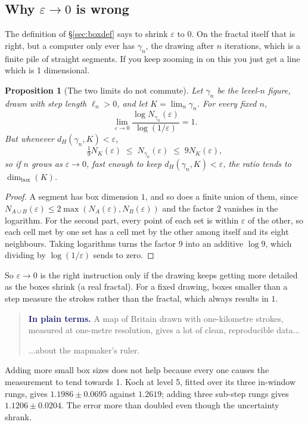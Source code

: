 \documentclass[11pt, a4paper]{article}
\theoremstyle{plain}
\newtheorem{proposition}[theorem]{Proposition}
\theoremstyle{definition}
\theoremstyle{remark}
\newenvironment{plainly}
  {\par\smallskip\begin{quote}\small\noindent
   \textcolor{MidnightBlue}{\textbf{In plain terms.}}\enspace\ignorespaces}
  {\end{quote}\smallskip}
\newcommand{\Bd}{\dim_{\mathrm{box}}}    %
\newcommand{\eps}{\varepsilon}
\begin{document}
\subsection{Why \texorpdfstring{$\eps \to 0$}{eps -> 0} is wrong}
\label{sec:rolloff}

The definition of \S\ref{sec:boxdef} says to shrink $\eps$ to $0$. On the
fractal itself that is right, but a computer only ever has $\gamma_n$, the
drawing after $n$ iterations, which is a finite pile of straight segments. If you keep zooming in on this you just get a line which is 1 dimensional.

\begin{proposition}[The two limits do not commute]
\label{prop:noncommuting}
    Let $\gamma_n$ be the level-$n$ figure, drawn with step length $\ell_n>0$,
    and let $K=\lim_n\gamma_n$. For every fixed $n$,
    \[
      \lim_{\eps\to0}\frac{\log N_{\gamma_n}(\eps)}{\log(1/\eps)} = 1.
    \]
    But whenever $d_H(\gamma_n,K)<\eps$,
    \[
      \tfrac19 N_K(\eps)\;\leq\;N_{\gamma_n}(\eps)\;\leq\;9N_K(\eps),
    \]
    so if $n$ grows as $\eps\to0$, fast enough to keep
    $d_H(\gamma_n,K)<\eps$, the ratio tends to $\Bd(K)$.
\end{proposition}
\begin{proof}
    A segment has box dimension $1$, and so does a finite union of them, since
    $N_{A\cup B}(\eps)\leq 2\max(N_A(\eps),N_B(\eps))$ and the factor $2$
    vanishes in the logarithm. For the second part, every point of each set is
    within $\eps$ of the other, so each cell met by one set has a cell met by
    the other among itself and its eight neighbours. Taking logarithms turns
    the factor $9$ into an additive $\log9$, which dividing by $\log(1/\eps)$ sends to zero.
\end{proof}

\noindent So $\eps\to0$ is the right instruction only if the drawing keeps getting more detailed as the boxes shrink (a real fractal). 
For a fixed drawing, boxes smaller than a step measure the strokes rather than the fractal, which always results in $1$.

\begin{plainly}
A map of Britain drawn with one-kilometre strokes, measured at one-metre resolution, 
gives a lot of clean, reproducible data... 

...about the mapmaker's ruler. %
\end{plainly}

\noindent Adding more small box sizes does not help because every one causes the measurement to tend towards 1. 
Koch at level 5, fitted over its three in-window rungs, gives $1.1986 \pm 0.0695$ against $1.2619$; adding three sub-step rungs gives $1.1206 \pm 0.0204$. 
The error more than doubled even though the uncertainty shrank.
\end{document}
